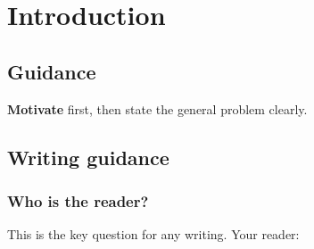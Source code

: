 \documentclass{l4proj}
\begin{document}
%
%
%
%
%
%
%


\chapter{Introduction}


\section{Guidance}

\textbf{Motivate} first, then state the general problem clearly. 

\section{Writing guidance}
\subsection{Who is the reader?}

This is the key question for any writing. Your reader:
\end{document}
